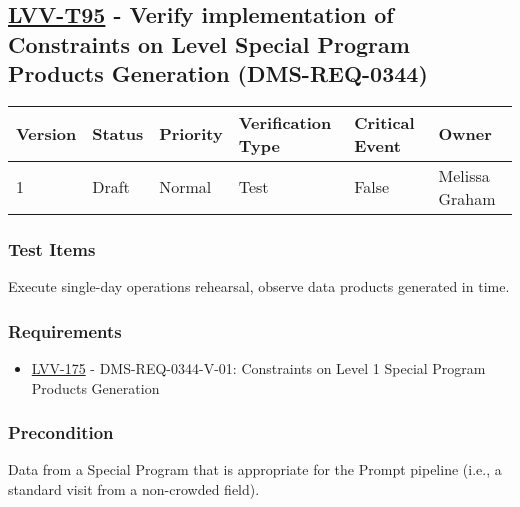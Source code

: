 \hypertarget{lvv-t95---verify-implementation-of-constraints-on-level-special-program-products-generation-dms-req-0344}{%
\subsection{\texorpdfstring{\href{https://jira.lsstcorp.org/secure/Tests.jspa\#/testCase/LVV-T95}{LVV-T95}
- Verify implementation of Constraints on Level Special Program Products
Generation
(DMS-REQ-0344)}{LVV-T95 - Verify implementation of Constraints on Level Special Program Products Generation (DMS-REQ-0344)}}\label{lvv-t95---verify-implementation-of-constraints-on-level-special-program-products-generation-dms-req-0344}}

\begin{longtable}[]{@{}llllll@{}}
\toprule
Version & Status & Priority & Verification Type & Critical Event &
Owner\tabularnewline
\midrule
\endhead
1 & Draft & Normal & Test & False & Melissa Graham\tabularnewline
\bottomrule
\end{longtable}

\hypertarget{test-items-71}{%
\subsubsection{Test Items}\label{test-items-71}}

Execute single-day operations rehearsal, observe data products generated
in time.

\hypertarget{requirements-72}{%
\subsubsection{Requirements}\label{requirements-72}}

\begin{itemize}
\tightlist
\item
  \href{https://jira.lsstcorp.org/browse/LVV-175}{LVV-175} -
  DMS-REQ-0344-V-01: Constraints on Level 1 Special Program Products
  Generation
\end{itemize}

\hypertarget{precondition-14}{%
\subsubsection{Precondition}\label{precondition-14}}

Data from a Special Program that is appropriate for the Prompt pipeline
(i.e., a standard visit from a non-crowded field).


